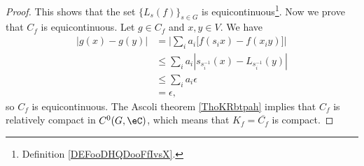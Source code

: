 \begin{proof}
    This shows that the set \( \{ L_s(f) \}_{s\in G}\) is equicontinuous\footnote{Definition \ref{DEFooDHQDooFfIvsX}.}. Now we prove that \( C_f\) is equicontinuous. Let \( g\in C_f\) and \( x,y\in V\). We have
    \begin{subequations}
        \begin{align}
            | g(x)-g(y) |&=\Big|   \sum_ia_i\big[ f(s_ix)-f(x_iy) \big]   \Big|\\
            &\leq \sum_ia_i| s_{s_i^{-1}}(x)-L_{s_i^{-1}}(y) |\\
            &\leq \sum_ia_i\epsilon\\
            &=\epsilon,
        \end{align}
    \end{subequations}
    so \( C_f\) is equicontinuous. The Ascoli theorem \ref{ThoKRbtpah} implies that \( C_f\) is relatively compact in \( C^0(G,\eC)\), which means that \( K_f=\overline{ C_f }\) is compact.


\end{proof}

